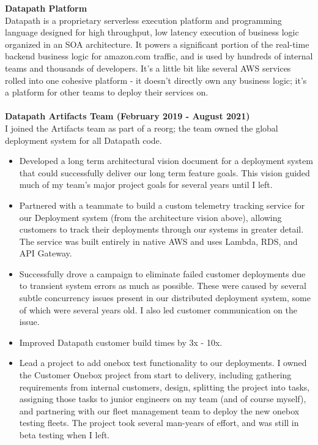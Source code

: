\documentclass{res}
\begin{document}
\begin{resume}
   {\large \bf Datapath Platform }\\
   Datapath is a proprietary serverless execution platform and programming language designed for high throughput, low latency execution of business logic organized in an SOA architecture.  It powers a significant portion of the real-time backend business logic for amazon.com traffic, and is used by hundreds of internal teams and thousands of developers.  It's a little bit like several AWS services rolled into one cohesive platform - it doesn't directly own any business logic; it's a platform for other teams to deploy their services on.\\
   \\
   {\bf Datapath Artifacts Team (February 2019 - August 2021) }\\
   I joined the Artifacts team as part of a reorg; the team owned the global deployment system for all Datapath code.
   \begin{itemize}
   \item Developed a long term architectural vision document for a deployment system that could successfully deliver our long term feature goals.  This vision guided much of my team's major project goals for several years until I left.
   \item Partnered with a teammate to build a custom telemetry tracking service for our Deployment system (from the architecture vision above), allowing customers to track their deployments through our systems in greater detail.  The service was built entirely in native AWS and uses Lambda, RDS, and API Gateway.
   \item Successfully drove a campaign to eliminate failed customer deployments due to transient system errors as much as possible.  These were caused by several subtle concurrency issues present in our distributed deployment system, some of which were several years old.  I also led customer communication on the issue.
   \item Improved Datapath customer build times by 3x - 10x.
   \item Lead a project to add onebox test functionality to our deployments.  I owned the Customer Onebox project from start to delivery, including gathering requirements from internal customers, design, splitting the project into tasks, assigning those tasks to junior engineers on my team (and of course myself), and partnering with our fleet management team to deploy the new onebox testing fleets.  The project took several man-years of effort, and was still in beta testing when I left.

\end{itemize}
\end{resume}
\end{document}
